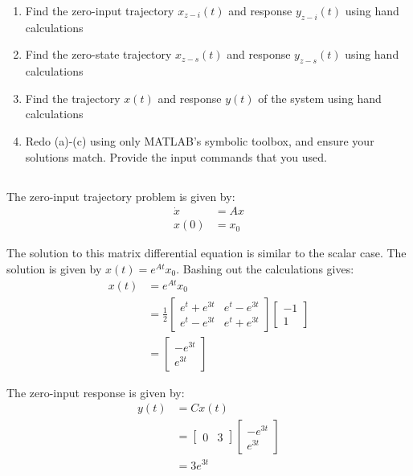\begin{enumerate}[label=(\alph*)]
    \item Find the zero-input trajectory $x_{z-i}(t)$ and response $y_{z-i}(t)$ using hand calculations
    \item Find the zero-state trajectory $x_{z-s}(t)$ and response $y_{z-s}(t)$ using hand calculations
    \item Find the trajectory $x(t)$ and response $y(t)$ of the system using hand calculations
    \item Redo (a)-(c) using only MATLAB's symbolic toolbox, and ensure your solutions match. Provide the input commands that you used.
\end{enumerate}

\subsection{}
The zero-input trajectory problem is given by:
\[
\begin{aligned}
    \dot{x} &= Ax \\
    x(0) &= x_0
\end{aligned}
\]

The solution to this matrix differential equation is similar to the scalar case.
The solution is given by $x(t) = e^{At}x_0$. Bashing out the calculations gives:
\[
\begin{aligned}
    x(t) &= e^{At}x_0 \\
    &= \frac{1}{2}
    \begin{bmatrix}
        e^t + e^{3t} & e^t - e^{3t} \\
        e^t - e^{3t} & e^t + e^{3t}
    \end{bmatrix}
    \begin{bmatrix}
        -1 \\
        1
    \end{bmatrix} \\
    &=
    \begin{bmatrix}
        -e^{3t} \\
        e^{3t}
    \end{bmatrix}
\end{aligned}
\]

The zero-input response is given by:
\[
\begin{aligned}
    y(t) &= Cx(t) \\
    &=
    \begin{bmatrix}
        0 & 3
    \end{bmatrix}
    \begin{bmatrix}
        -e^{3t} \\
        e^{3t}
    \end{bmatrix} \\
    &= 3e^{3t}
\end{aligned}
\]

